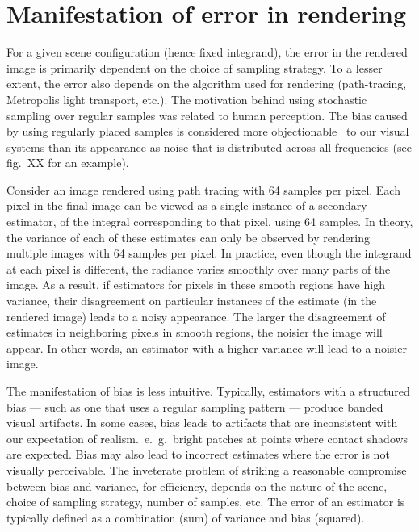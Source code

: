 %
%
%
\section{Manifestation of error in rendering}
For a given scene configuration (hence fixed integrand), the error in the rendered image is primarily dependent on the choice of sampling strategy. To a lesser extent, the error also depends on the algorithm used for rendering (path-tracing, Metropolis light transport, etc.). The motivation behind using stochastic sampling over regular samples was related to human perception. The bias caused by using regularly placed samples is considered more objectionable~\cite{} to our visual systems than its appearance as noise that is distributed across all frequencies (see fig.~XX for an example). 

Consider an image rendered using path tracing with 64 samples per pixel. Each pixel in the final image can be viewed as a single instance of a secondary estimator, of the integral corresponding to that pixel, using 64 samples. In theory, the variance of each of these estimates can only be observed by rendering multiple images with 64 samples per pixel. In practice, even though the integrand at each pixel is different, the radiance varies smoothly over many parts of the image. As a result, if estimators for pixels in these smooth regions have high variance, their disagreement on particular instances of the estimate (in the rendered image) leads to a noisy appearance. The larger the disagreement of estimates in neighboring pixels in smooth regions, the noisier the image will appear. In other words, an estimator with a higher variance will lead to a noisier image.

The manifestation of bias is less intuitive. Typically, estimators with a structured bias --- such as one that uses a regular sampling pattern --- produce banded visual artifacts. In some cases, bias leads to artifacts that are inconsistent with our expectation of realism.~e.~g.~bright patches at points where contact shadows are expected. Bias may also lead to incorrect estimates where the error is not visually perceivable. The inveterate problem of striking a reasonable compromise between bias and variance, for efficiency, depends on the nature of the scene, choice of sampling strategy, number of samples, etc. The error of an estimator is typically defined as a combination (sum) of variance and bias (squared). 

